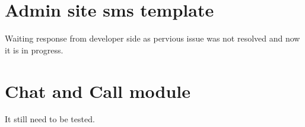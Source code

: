 \documentclass[12pt,a4paper]{article}
\begin{document}
\section{Admin site sms template}
Waiting response from developer side as pervious issue was not resolved and now it is in progress.
\section{Chat and Call module}
It still need to be tested.
\end{document}
